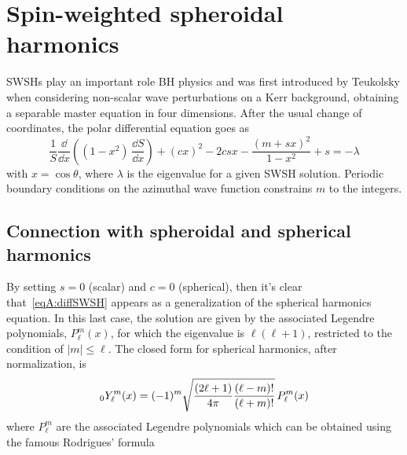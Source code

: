 
\label{AppendixA} %
\chapter{Spin-weighted spheroidal harmonics} %

SWSHs play an important role BH physics and was first introduced by Teukolsky when considering non-scalar wave perturbations on a Kerr background, obtaining a separable master equation in four dimensions. After the usual change of coordinates, the polar differential equation goes as 
\begin{equation}
	\frac{1}{S} \frac{\dd}{\dd x} \left( (1-x^2) \, \frac{\dd S}{\dd x} \right) + (c x)^2 - 2 c s x  -\frac{(m + s x)^2}{1 - x^2} + s  = - \lambda 
	\label{eqA:diffSWSH}
\end{equation}
with $x=\cos\theta$, where $\lambda$ is the eigenvalue for a given SWSH solution. Periodic boundary conditions on the azimuthal wave function constrains $m$ to the integers.   

\section{Connection with spheroidal and spherical harmonics}

By setting $s=0$ (scalar) and $c=0$ (spherical), then it's clear that~\eqref{eqA:diffSWSH} appears as a generalization of the spherical harmonics equation. In this last case, the solution are given by the associated Legendre polynomials, $P^m_\ell (x)$, for which the eigenvalue is $\ell(\ell+1)$, restricted to the condition of $|m| \le \ell$. The closed form for spherical harmonics, after normalization, is
\begin{equation}
	\sts[0]{Y^m}{\ell}(x)= (-1)^{m} \sqrt{\frac{(2\ell +1)}{4\pi} \frac{(\ell -m)!}{(\ell +m)!}} \, P_\ell^m (x)
	\label{eqA:SH}
\end{equation}
where $P_{\ell }^{m}$ are the associated Legendre polynomials which can be obtained using the famous Rodrigues' formula